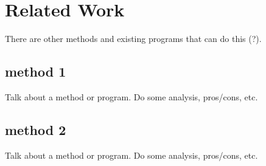 \section{Related Work}
There are other methods and existing programs that can do this (?).
\subsection{method 1}
Talk about a method or program. Do some analysis, pros/cons, etc.
\subsection{method 2}
Talk about a method or program. Do some analysis, pros/cons, etc.